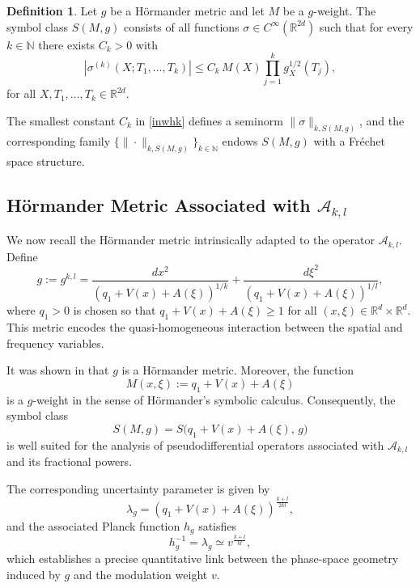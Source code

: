 \documentclass[12pt,reqno,a4paper]{amsart}
\numberwithin{equation}{section}
\theoremstyle{plain}
\theoremstyle{definition}
\newtheorem{definition}[theorem]{Definition}
\theoremstyle{remark}
\begin{document}
\begin{definition}
Let $g$ be a H\"ormander metric and let $M$ be a $g$-weight.
The symbol class $S(M,g)$ consists of all functions
$\sigma\in C^\infty(\mathbb{R}^{2d})$ such that for every $k\in\mathbb{N}$
there exists $C_k>0$ with
\begin{equation}\label{inwhk}
|\sigma^{(k)}(X;T_1,\ldots,T_k)|
\le C_k\,M(X)\prod_{j=1}^k g_X^{1/2}(T_j),
\end{equation}
for all $X,T_1,\ldots,T_k\in\mathbb{R}^{2d}$.
\end{definition}

The smallest constant $C_k$ in \eqref{inwhk} defines a seminorm
$\|\sigma\|_{k,S(M,g)}$, and the corresponding family
$\{\|\cdot\|_{k,S(M,g)}\}_{k\in\mathbb{N}}$ endows $S(M,g)$ with a Fr\'echet space
structure.

\subsection{Hörmander Metric Associated with $\mathcal A_{k,l}$}

We now recall the Hörmander metric intrinsically adapted to the operator $\mathcal A_{k,l}$.
Define
\[
g:=g^{k,l}
= \frac{dx^2}{(q_{1}+V(x)+ A(\xi))^{1/k}}
+ \frac{d\xi^2}{(q_{1}+V(x)+A(\xi))^{1/l}},
\]
where $q_{1}>0$ is chosen so that $q_{1}+V(x)+A(\xi)\ge1$ for all
$(x,\xi)\in\mathbb R^d\times\mathbb R^d$.
This metric encodes the quasi-homogeneous interaction between the spatial and frequency
variables.

It was shown in \cite{MR4299820,MR4489248} that $g$ is a Hörmander metric. Moreover, the
function
\[
M(x,\xi):=q_{1}+V(x)+A(\xi)
\]
is a $g$-weight in the sense of Hörmander's symbolic calculus. Consequently, the symbol class
\[
S(M,g)=S\bigl(q_{1}+V(x)+A(\xi),\,g\bigr)
\]
is well suited for the analysis of pseudodifferential operators associated with
$\mathcal A_{k,l}$ and its fractional powers.

The corresponding uncertainty parameter is given by
\[
\lambda_g
= (q_{1}+V(x)+A(\xi))^{\frac{k+l}{2kl}},
\]
and the associated Planck function $h_g$ satisfies
\[
h_g^{-1}=\lambda_g \simeq v^{\frac{k+l}{kl}},
\]
which establishes a precise quantitative link between the phase-space geometry induced by $g$
and the modulation weight $v$.

\end{document}
